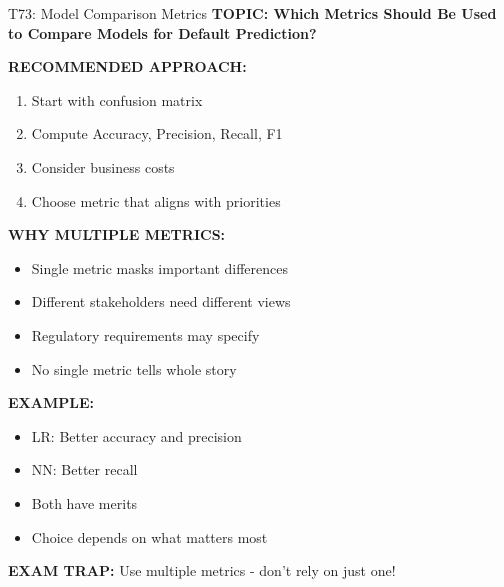 \documentclass[8pt]{beamer}
\begin{document}
	\begin{frame}{T73: Model Comparison Metrics}
		\fontsize{6.5}{7.5}\selectfont
		\textbf{TOPIC: Which Metrics Should Be Used to Compare Models for Default Prediction?}
		
		\vspace{0.1cm}
		\textbf{RECOMMENDED APPROACH:}
		\begin{enumerate}
			\item Start with confusion matrix
			\item Compute Accuracy, Precision, Recall, F1
			\item Consider business costs
			\item Choose metric that aligns with priorities
		\end{enumerate}
		
		\vspace{0.1cm}
		\textbf{WHY MULTIPLE METRICS:}
		\begin{itemize}
			\item Single metric masks important differences
			\item Different stakeholders need different views
			\item Regulatory requirements may specify
			\item No single metric tells whole story
		\end{itemize}
		
		\vspace{0.1cm}
		\textbf{EXAMPLE:}
		\begin{itemize}
			\item LR: Better accuracy and precision
			\item NN: Better recall
			\item Both have merits
			\item Choice depends on what matters most
		\end{itemize}
		
		\textcolor{myred}{\textbf{EXAM TRAP:}} Use \textcolor{myblue}{multiple metrics} - don't rely on just one!
	\end{frame}
	
\end{document}
